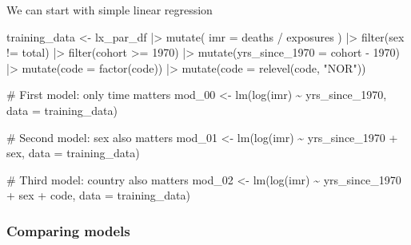 \documentclass[
  letterpaper,
  DIV=11,
  numbers=noendperiod]{scrartcl}
\newenvironment{Shaded}{\begin{snugshade}}{\end{snugshade}}
\newcommand{\AttributeTok}[1]{\textcolor[rgb]{0.40,0.45,0.13}{#1}}
\newcommand{\CommentTok}[1]{\textcolor[rgb]{0.37,0.37,0.37}{#1}}
\newcommand{\DecValTok}[1]{\textcolor[rgb]{0.68,0.00,0.00}{#1}}
\newcommand{\FunctionTok}[1]{\textcolor[rgb]{0.28,0.35,0.67}{#1}}
\newcommand{\NormalTok}[1]{\textcolor[rgb]{0.00,0.23,0.31}{#1}}
\newcommand{\OtherTok}[1]{\textcolor[rgb]{0.00,0.23,0.31}{#1}}
\newcommand{\SpecialCharTok}[1]{\textcolor[rgb]{0.37,0.37,0.37}{#1}}
\newcommand{\StringTok}[1]{\textcolor[rgb]{0.13,0.47,0.30}{#1}}
\begin{document}
We can start with simple linear regression

\begin{Shaded}
\begin{Highlighting}[]
\NormalTok{training\_data }\OtherTok{\textless{}{-}} 
\NormalTok{  lx\_par\_df }\SpecialCharTok{|\textgreater{}} 
  \FunctionTok{mutate}\NormalTok{(}
    \AttributeTok{imr =}\NormalTok{ deaths }\SpecialCharTok{/}\NormalTok{ exposures}
\NormalTok{  ) }\SpecialCharTok{|\textgreater{}} 
  \FunctionTok{filter}\NormalTok{(sex }\SpecialCharTok{!=} \StringTok{\textquotesingle{}total\textquotesingle{}}\NormalTok{) }\SpecialCharTok{|\textgreater{}} 
  \FunctionTok{filter}\NormalTok{(cohort }\SpecialCharTok{\textgreater{}=} \DecValTok{1970}\NormalTok{) }\SpecialCharTok{|\textgreater{}} 
  \FunctionTok{mutate}\NormalTok{(}\AttributeTok{yrs\_since\_1970 =}\NormalTok{ cohort }\SpecialCharTok{{-}} \DecValTok{1970}\NormalTok{) }\SpecialCharTok{|\textgreater{}} 
  \FunctionTok{mutate}\NormalTok{(}\AttributeTok{code =} \FunctionTok{factor}\NormalTok{(code)) }\SpecialCharTok{|\textgreater{}} 
  \FunctionTok{mutate}\NormalTok{(}\AttributeTok{code =} \FunctionTok{relevel}\NormalTok{(code, }\StringTok{"NOR"}\NormalTok{))}

\CommentTok{\# First model: only time matters}
\NormalTok{mod\_00 }\OtherTok{\textless{}{-}} \FunctionTok{lm}\NormalTok{(}\FunctionTok{log}\NormalTok{(imr) }\SpecialCharTok{\textasciitilde{}}\NormalTok{ yrs\_since\_1970, }
             \AttributeTok{data =}\NormalTok{ training\_data)}

\CommentTok{\# Second model: sex also matters }
\NormalTok{mod\_01 }\OtherTok{\textless{}{-}} \FunctionTok{lm}\NormalTok{(}\FunctionTok{log}\NormalTok{(imr) }\SpecialCharTok{\textasciitilde{}}\NormalTok{ yrs\_since\_1970 }\SpecialCharTok{+}\NormalTok{ sex, }
             \AttributeTok{data =}\NormalTok{ training\_data)}

\CommentTok{\# Third model: country also matters}
\NormalTok{mod\_02 }\OtherTok{\textless{}{-}} \FunctionTok{lm}\NormalTok{(}\FunctionTok{log}\NormalTok{(imr) }\SpecialCharTok{\textasciitilde{}}\NormalTok{ yrs\_since\_1970 }\SpecialCharTok{+}\NormalTok{ sex }\SpecialCharTok{+}\NormalTok{ code, }
             \AttributeTok{data =}\NormalTok{ training\_data)}
\end{Highlighting}
\end{Shaded}

\hypertarget{comparing-models}{%
\subsubsection{Comparing models}\label{comparing-models}}
\end{document}
